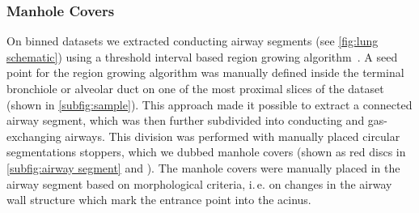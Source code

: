 \documentclass[%
	paper=a4,%
	DIV=calc,%
	twoside=true,%
	abstract=true,%
	]{scrartcl}
\newcommand{\ie}{i.\,e.\xspace}
\begin{document}
\subsubsection{Manhole Covers\label{sec:manholecovers}}
On binned datasets we extracted conducting airway segments (see \autoref{fig:lung schematic}) using a threshold interval based region growing algorithm~\cite{Zucker1976}. A seed point for the region growing algorithm was manually defined inside the terminal bronchiole or alveolar duct on one of the most proximal slices of the dataset (shown in \autoref{subfig:sample}). This approach made it possible to extract a connected airway segment, which was then further subdivided into conducting and gas-exchanging airways. This division was performed with manually placed circular segmentations stoppers, which we dubbed manhole covers (shown as red discs in \autoref{subfig:airway segment} and ). The manhole covers were manually placed in the airway segment based on morphological criteria, \ie on changes in the airway wall structure which mark the entrance point into the acinus.
\end{document}
